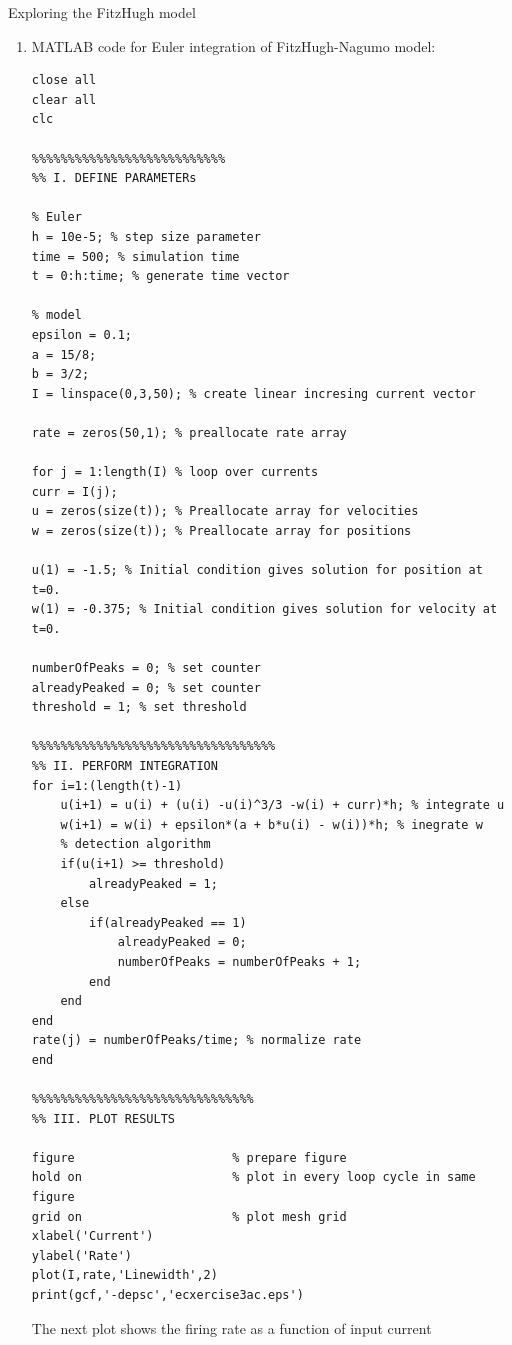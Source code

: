 \documentclass[12pt]{article}
\newenvironment{exercise}[2][Exercise]{\begin{trivlist}
\item[\hskip \labelsep {\bfseries #1}\hskip \labelsep {\bfseries #2.}]}{\end{trivlist}}
\begin{document}
\begin{exercise}{3.3}
Exploring the FitzHugh model \\
\renewcommand{\labelenumi}{\alph{enumi})}
\begin{enumerate}
\item MATLAB code for Euler integration of FitzHugh-Nagumo model:
\begin{tiny}
\begin{lstlisting}
close all
clear all
clc

%%%%%%%%%%%%%%%%%%%%%%%%%%%
%% I. DEFINE PARAMETERs

% Euler
h = 10e-5; % step size parameter
time = 500; % simulation time
t = 0:h:time; % generate time vector

% model
epsilon = 0.1;
a = 15/8;
b = 3/2;
I = linspace(0,3,50); % create linear incresing current vector

rate = zeros(50,1); % preallocate rate array

for j = 1:length(I) % loop over currents
curr = I(j);
u = zeros(size(t)); % Preallocate array for velocities
w = zeros(size(t)); % Preallocate array for positions

u(1) = -1.5; % Initial condition gives solution for position at t=0.
w(1) = -0.375; % Initial condition gives solution for velocity at t=0.

numberOfPeaks = 0; % set counter
alreadyPeaked = 0; % set counter
threshold = 1; % set threshold

%%%%%%%%%%%%%%%%%%%%%%%%%%%%%%%%%%
%% II. PERFORM INTEGRATION
for i=1:(length(t)-1)
    u(i+1) = u(i) + (u(i) -u(i)^3/3 -w(i) + curr)*h; % integrate u
    w(i+1) = w(i) + epsilon*(a + b*u(i) - w(i))*h; % inegrate w
    % detection algorithm
    if(u(i+1) >= threshold)
        alreadyPeaked = 1;
    else
        if(alreadyPeaked == 1)
            alreadyPeaked = 0;
            numberOfPeaks = numberOfPeaks + 1;
        end
    end
end
rate(j) = numberOfPeaks/time; % normalize rate
end

%%%%%%%%%%%%%%%%%%%%%%%%%%%%%%%
%% III. PLOT RESULTS

figure                      % prepare figure
hold on                     % plot in every loop cycle in same figure
grid on                     % plot mesh grid
xlabel('Current')
ylabel('Rate')
plot(I,rate,'Linewidth',2)
print(gcf,'-depsc','ecxercise3ac.eps')
\end{lstlisting}
\end{tiny}
The next plot shows the firing rate as a function of input current


\end{enumerate}
\end{exercise}
\end{document}
